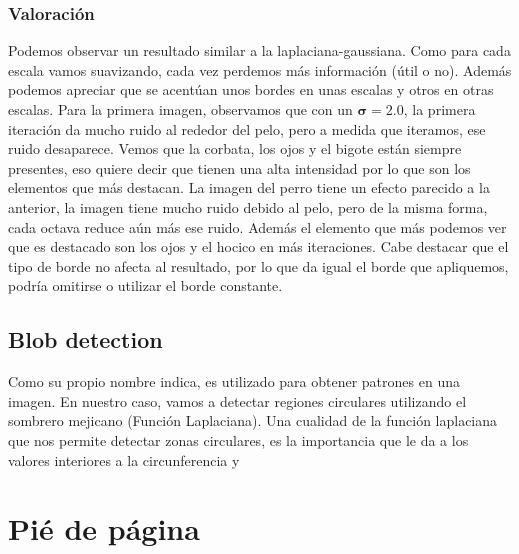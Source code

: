 \documentclass{article}
\begin{document}
\subsubsection{Valoración}
Podemos observar un resultado similar a la laplaciana-gaussiana. Como para cada escala vamos suavizando, cada vez perdemos más información (útil o no). Además podemos apreciar que se acentúan unos bordes en unas escalas y otros en otras escalas.
\newline
\newline
Para la primera imagen, observamos que con un $\boldsymbol{\sigma} = 2.0$, la primera iteración da mucho ruido al rededor del pelo, pero a medida que iteramos, ese ruido desaparece.  Vemos que la corbata, los ojos y el bigote están siempre presentes, eso quiere decir que tienen una alta intensidad por lo que son los elementos que más destacan.
\newline
\newline
La imagen del perro tiene un efecto parecido a la anterior, la imagen tiene mucho ruido debido al pelo, pero de la misma forma, cada octava reduce aún más ese ruido. Además el elemento que más podemos ver que es destacado son los ojos y el hocico en más iteraciones.
\newline
\newline
Cabe destacar que el tipo de borde no afecta al resultado, por lo que da igual el borde que apliquemos, podría omitirse o utilizar el borde constante.

\subsection{Blob detection}
Como su propio nombre indica, es utilizado para obtener patrones en una imagen. En nuestro caso, vamos a detectar regiones circulares utilizando el sombrero mejicano (Función Laplaciana). 
\newline\newline
Una cualidad de la función laplaciana que nos permite detectar zonas circulares, es la importancia que le da a los valores interiores a la circunferencia y 

\newpage

\section{Pié de página}
\end{document}
